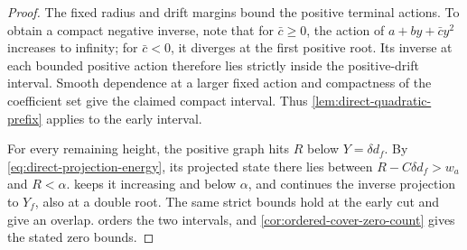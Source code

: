 \begin{proof}
The fixed radius and drift margins bound the positive terminal actions.
To obtain a compact negative inverse, note that
for \(\bar c\ge0\), the action of \(a+by+\bar c y^2\)
increases to infinity; for \(\bar c<0\), it diverges at the first
positive root. Its inverse at each bounded positive action therefore
lies strictly inside the positive-drift interval. Smooth dependence
at a larger fixed action and compactness of the coefficient set give
the claimed compact interval. Thus
\cref{lem:direct-quadratic-prefix} applies to the early interval.

For every remaining height, the positive graph hits \(R\) below
\(Y=\delta d_f\). By \eqref{eq:direct-projection-energy}, its projected
state there lies between \(R-C\delta d_f>w_a\) and \(R<\alpha\).
 keeps it increasing and below
\(\alpha\), and continues the inverse projection to \(Y_f\), also at a double
root. The same strict bounds hold at the early cut and give an overlap.
 orders the two intervals, and
\cref{cor:ordered-cover-zero-count} gives the stated zero bounds.
\end{proof}
